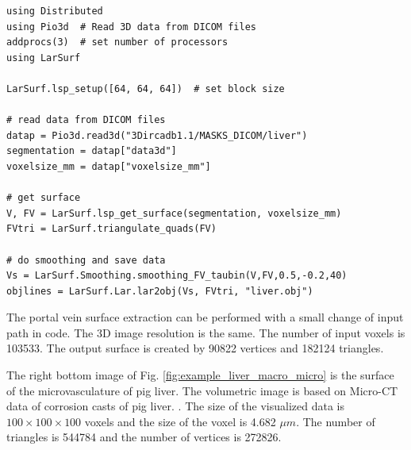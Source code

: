 \begin{lstlisting}[caption={Get surface from DICOM volumetric data}, label={lst:example1}]
using Distributed
using Pio3d  # Read 3D data from DICOM files
addprocs(3)  # set number of processors
using LarSurf

LarSurf.lsp_setup([64, 64, 64])  # set block size

# read data from DICOM files
datap = Pio3d.read3d("3Dircadb1.1/MASKS_DICOM/liver")
segmentation = datap["data3d"]
voxelsize_mm = datap["voxelsize_mm"]

# get surface
V, FV = LarSurf.lsp_get_surface(segmentation, voxelsize_mm)
FVtri = LarSurf.triangulate_quads(FV)

# do smoothing and save data
Vs = LarSurf.Smoothing.smoothing_FV_taubin(V,FV,0.5,-0.2,40)
objlines = LarSurf.Lar.lar2obj(Vs, FVtri, "liver.obj")
\end{lstlisting}

The portal vein surface extraction can be performed with a small change of input path in code.
The 3D image resolution is the same. 
The number of input voxels is 103533. 
The output surface is created by 90822 vertices and 182124 triangles. 

The right bottom image of Fig. \ref{fig:example_liver_macro_micro} is the surface of the microvasculature of pig liver. 
The volumetric image is based on Micro-CT data of corrosion casts of pig liver.
\cite{eberlova2017use}.
The size of the visualized data is $100\times100\times100$ voxels and the size of the voxel is 4.682 $\mu{}m$.
The number of triangles is 
544784 and the number of vertices is 272826.








